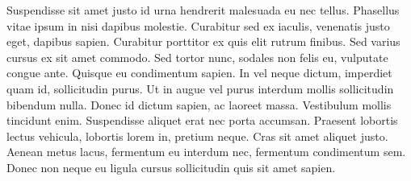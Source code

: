 Suspendisse sit amet justo id urna hendrerit malesuada eu nec tellus. Phasellus vitae ipsum in nisi dapibus molestie. Curabitur sed ex iaculis, venenatis justo eget, dapibus sapien. Curabitur porttitor ex quis elit rutrum finibus. Sed varius cursus ex sit amet commodo. Sed tortor nunc, sodales non felis eu, vulputate congue ante. Quisque eu condimentum sapien. In vel neque dictum, imperdiet quam id, sollicitudin purus. Ut in augue vel purus interdum mollis sollicitudin bibendum nulla. Donec id dictum sapien, ac laoreet massa. Vestibulum mollis tincidunt enim. Suspendisse aliquet erat nec porta accumsan. Praesent lobortis lectus vehicula, lobortis lorem in, pretium neque. Cras sit amet aliquet justo. Aenean metus lacus, fermentum eu interdum nec, fermentum condimentum sem. Donec non neque eu ligula cursus sollicitudin quis sit amet sapien.